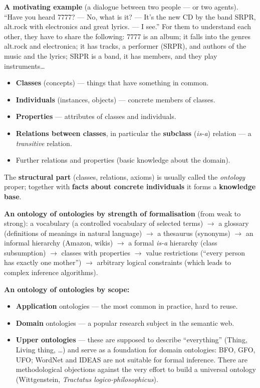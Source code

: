 \documentclass[11pt,a4paper]{article}
\theoremstyle{definition}
\providecommand{\uv}[1]{``#1''}
\begin{document}
\textbf{A motivating example} (a dialogue between two people --- or two agents). \uv{Have you heard
7777? --- No, what is it? --- It's the new CD by the band SRPR, alt.rock with electronics and great
lyrics. --- I see.} For them to understand each other, they have to share the following:
7777 is an album; it falls into the genres alt.rock and electronica; it has tracks, a performer
(SRPR), and authors of the music and the lyrics; SRPR is a band, it has members, and they play
instruments\dots

\begin{defbox}
\begin{itemize}
\item \textbf{Classes} (concepts) --- things that have something in common.
\item \textbf{Individuals} (instances, objects) --- concrete members of classes.
\item \textbf{Properties} --- attributes of classes and individuals.
\item \textbf{Relations between classes}, in particular the \textbf{subclass} (\emph{is-a}) relation
  --- a \emph{transitive} relation.
\item Further relations and properties (basic knowledge about the domain).
\end{itemize}
The \textbf{structural part} (classes, relations, axioms) is usually called the \emph{ontology}
proper; together with \textbf{facts about concrete individuals} it forms a \textbf{knowledge base}.
\end{defbox}

\textbf{An ontology of ontologies by strength of formalisation} (from weak to strong):
a vocabulary (a controlled vocabulary of selected terms) $\to$ a glossary (definitions of meanings in
natural language) $\to$ a thesaurus (synonyms) $\to$ an informal hierarchy (Amazon, wikis) $\to$
a formal \emph{is-a} hierarchy (class subsumption) $\to$ classes with properties $\to$
value restrictions (\uv{every person has exactly one mother}) $\to$ arbitrary logical constraints
(which leads to complex inference algorithms).

\textbf{An ontology of ontologies by scope:}
\begin{itemize}
\item \textbf{Application} ontologies --- the most common in practice, hard to reuse.
\item \textbf{Domain} ontologies --- a popular research subject in the semantic web.
\item \textbf{Upper ontologies} --- these are supposed to describe \uv{everything}
  (Thing, Living thing, \dots) and serve as a foundation for domain ontologies:
  BFO, GFO, UFO; WordNet and IDEAS are not suitable for formal inference.
  There are methodological objections against the very effort to build a universal ontology
  (Wittgenstein, \emph{Tractatus logico-philosophicus}).
\end{itemize}
\end{document}
